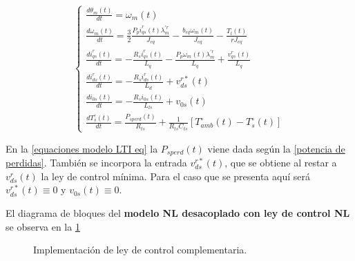 \documentclass[a4paper, 10pt, onecolumn,journal]{ieeeconf}
\begin{document}
\begin{equation}
	\begin{cases}
		\frac{d \theta_m(t)}{dt} = {\omega}_m(t)\\
		\frac{d \omega_m(t)}{dt} = \frac{3}{2} \frac{P_p i^r_{qs}(t)\lambda^{'r}_m}{J_{eq}} - \frac{b_{eq}\omega_m(t)}{J_{eq}} - \frac{T_l(t)}{r J_{eq}}\\
		\frac{d i^r_{qs}(t)}{dt} = -\frac{R_s i^r_{qs}(t)}{L_q} - \frac{P_p \omega_m(t) \lambda^{'r}_m}{L_q}+ \frac{v^r_{qs}(t)}{L_q}\\
		\frac{d i^r_{ds}(t)}{dt} = -\frac{R_s i^r_{ds}(t)}{L_d}	+ v^{r*}_{ds}(t)\\
		\frac{d i_{0s}(t)}{dt} = -\frac{R_s i_{0s}(t)}{L_{ls}}	+ v_{0s}(t)\\
		\frac{d T^\circ_{s}(t)}{dt} = \frac{P_{sperd}(t)}{R_{ts}} + \frac{1}{R_{ts}C_{ts}}\left[T^{\circ}_{amb}(t) - T_{s}^{\circ}(t)\right]
	\end{cases}
	\label{equaciones modelo LTI eq}
\end{equation}

En la \cref{equaciones modelo LTI eq} la $P_{sperd}(t)$ viene dada según la \cref{potencia de perdidas}. También se incorpora la entrada $v^{r*}_{ds}(t)$, que se obtiene al restar a  $v^r_{ds}(t)$
la ley de control mínima. Para el caso que se presenta aquí será $v^{r*}_{ds}(t) \equiv 0$ y $v_{0s}(t) \equiv0 $.


El diagrama de bloques del \textbf{modelo NL desacoplado con ley de control NL} se observa en la \cref{Implementación de ley de control complementaria}

\begin{figure}[H]
	\centering
	\begin{adjustbox}{scale=0.7,max width=\columnwidth}
	\end{adjustbox}
	\caption{Implementación de ley de control complementaria.}
	\label{Implementación de ley de control complementaria}
\end{figure}
\end{document}
